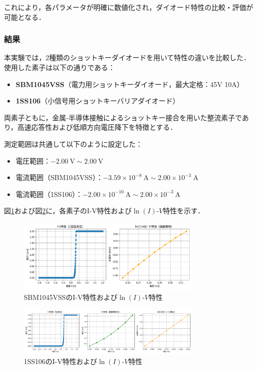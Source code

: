 これにより，各パラメータが明確に数値化され，ダイオード特性の比較・評価が可能となる．

\subsubsection*{結果}

本実験では，2種類のショットキーダイオードを用いて特性の違いを比較した．使用した素子は以下の通りである：

\begin{itemize}
    \item \textbf{SBM1045VSS}（電力用ショットキーダイオード，最大定格：45V 10A）
    \item \textbf{1SS106}（小信号用ショットキーバリアダイオード）
\end{itemize}

両素子ともに，金属-半導体接触によるショットキー接合を用いた整流素子であり，高速応答性および低順方向電圧降下を特徴とする．

測定範囲は共通して以下のように設定した：

\begin{itemize}
    \item 電圧範囲：$-2.00~\mathrm{V} \sim 2.00~\mathrm{V}$
    \item 電流範囲（SBM1045VSS）：$-3.59 \times 10^{-8}~\mathrm{A} \sim 2.00 \times 10^{-3}~\mathrm{A}$
    \item 電流範囲（1SS106）：$-2.00 \times 10^{-10}~\mathrm{A} \sim 2.00 \times 10^{-3}~\mathrm{A}$
\end{itemize}

図\ref{fig:iv_log_plot}および図\ref{fig:iv_small}に，各素子のI-V特性および$\ln(I)$-$V$特性を示す．

\begin{figure}[H]
    \centering
    \includegraphics[width=0.8\textwidth]{figure/Figure_1.pdf}
    \caption{SBM1045VSSのI-V特性および$\ln(I)$-$V$特性}
    \label{fig:iv_log_plot}
\end{figure}

\begin{figure}[H]
    \centering
    \includegraphics[width=0.8\textwidth]{figure/Figure_3.pdf}
    \caption{1SS106のI-V特性および$\ln(I)$-$V$特性}
    \label{fig:iv_small}
\end{figure}

